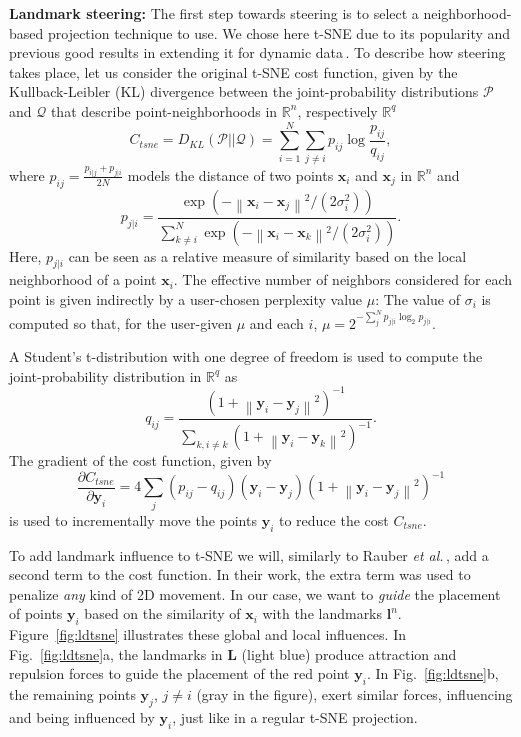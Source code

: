 \vspace{-0.15cm}
\noindent\textbf{Landmark steering:} The first step towards steering is to select a neighborhood-based projection technique to use. We chose here t-SNE due to its popularity and previous good results in extending it for dynamic data\,\cite{Rauber2016}. To describe how steering takes place, let us consider the original t-SNE cost function, given by the Kullback-Leibler (KL) divergence between the joint-probability distributions $\mathcal P$ and $\mathcal Q$ that describe point-neighborhoods in $\mathbb{R}^n$, respectively $\mathbb{R}^q$
%
\begin{equation}
C_{tsne} = D_{KL}\left(\mathcal{P}||\mathcal{Q}\right) =  \sum_{i=1}^{N} \sum_{j\neq i} p_{i j} \log \frac{p_{i j}}{q_{i j}},
\label{eqn:c_tsne}
\end{equation}
%
where $ p_{ij}=\frac{p_{i | j}+p_{j | i}}{2 N}$ models the distance of two points $\mathbf{x}_i$ and $\mathbf{x}_j$ in $\mathbb{R}^n$ and
%
$$ p_{j | i}=\frac{\exp \left(-\left\|\mathbf{x}_{i}-\mathbf{x}_{j}\right\|^{2} / \left(2 \sigma_{i}^{2}\right)\right)}  
{\sum_{k \neq i}^{N} \exp \left(-\left\|\mathbf{x}_{i}-\mathbf{x}_{k}\right\|^{2} /\left(2 \sigma_{i}^{2}\right)\right)}. $$
%
Here, $p_{j|i}$ can be seen as a relative measure of similarity based on the local neighborhood of a point $\mathbf{x}_i$. The effective number of neighbors considered for each point is given indirectly by a user-chosen perplexity value $\mu$: The value of $\sigma_i$ is computed so that, for the user-given $\mu$ and each $i$, $\mu=2^{-\sum_{j}^{N} p_{j | i} \log _{2} p_{j | i}}$.

A Student's t-distribution with one degree of freedom is used to compute the joint-probability distribution in $\mathbb{R}^q$ as
%
$$q_{i j}=\frac{\left(1+\left\|\mathbf{y}_{i}-\mathbf{y}_{j}\right\|^{2}\right)^{-1}}{\sum_{k, i \neq k}\left(1+\left\|\mathbf{y}_{i}-\mathbf{y}_{k}\right\|^{2}\right)^{-1}}.
$$
The gradient of the cost function, given by
%
\begin{equation}
 \frac{\partial C_{tsne}}{\partial \mathbf{y}_{i}}=4 \sum_{j}\left(p_{i j}-q_{i j}\right)\left(\mathbf{y}_{i}-\mathbf{y}_{j}\right)\left(1+\left\|\mathbf{y}_{i}-\mathbf{y}_{j}\right\|^{2}\right)^{-1} 
 \label{eqn:grad_tsne}
\end{equation}
%
is used to incrementally move the points $\mathbf{y}_i$ to reduce the cost $C_{tsne}$.

To add landmark influence to t-SNE we will, similarly to Rauber \emph{et al.}\,\cite{Rauber2016}, add a second term to the cost function. In their work, the extra term was used to penalize \emph{any} kind of 2D movement. In our case, we want to \emph{guide} the placement of points $\mathbf{y}_i$ based on the similarity of $\mathbf{x}_i$ with the landmarks $\mathbf{l}^n$. Figure~\ref{fig:ldtsne} illustrates these global and local influences. In Fig.~\ref{fig:ldtsne}a, the landmarks in $\mathbf{L}$ (light blue) produce attraction and repulsion forces to guide the placement of the red point $\mathbf{y}_i$. In Fig.~\ref{fig:ldtsne}b, the remaining points $\mathbf{y}_j$, $j \neq i$ (gray in the figure), exert similar forces, influencing and being influenced by $\mathbf{y}_i$, just like in a regular t-SNE projection.

